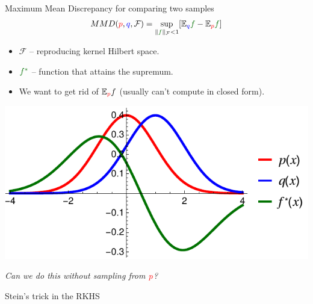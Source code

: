 \begin{frame}
\begin{columns}
\begin{column}{.33\linewidth}
\begin{block}{Maximum Mean Discrepancy for comparing two samples}
{\large\begin{align*}
MMD({\color{red} p},{ \color{blue} q},\mathcal{F}) = \sup_{   \| {\color{mg}f} \|_\mathcal{F}<1} [\ev_{{ \color{blue} q}}{\color{mg}f}- \ev_{{\color{red} p}}{\color{mg} f}]   
\end{align*}}
\begin{minipage}{.60\linewidth}

\vspace{1cm}

\normalsize
\vspace{1cm}
 \begin{itemize}
  \item $\mathcal{F}$ -- reproducing kernel Hilbert space.
  \item ${\color{mg} f^*}$ -- function that attains the supremum.
  \item We want to get rid of  $\mathbb{E}_{ {\color{red} p} }f$ (usually can't compute in closed form).
 \end{itemize}

\end{minipage}
\begin{minipage}{.35\linewidth}

\begin{center}
\vspace{-1cm}
\hspace{-2.5cm}
\includegraphics[scale=1.0]{../../presentation/img/mmd.pdf}
\end{center}
\end{minipage}
\vspace{1cm}
\begin{center}
{\large\emph{Can we do this without sampling from ${\color{red} p}$?}}
\end{center}
\end{block}
\vspace{-0.75cm}  %
\begin{block}{Stein's trick in the RKHS}


\end{block}
\end{column}
\end{columns}
\end{frame}
